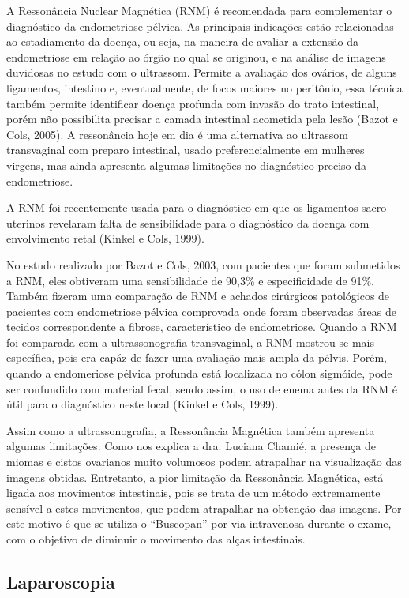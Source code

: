 \documentclass[12pt]{article} %
\begin{document}
A Ressonância Nuclear Magnética (RNM) é recomendada para complementar o diagnóstico da endometriose pélvica. As principais indicações estão relacionadas ao estadiamento da doença, ou seja, na maneira de avaliar a extensão da endometriose em relação ao órgão no qual se originou, e na análise de imagens duvidosas no estudo com o ultrassom. Permite a avaliação dos ovários, de alguns ligamentos, intestino e, eventualmente, de focos maiores no peritônio, essa técnica também permite identificar
doença profunda com invasão do trato intestinal, porém
não possibilita precisar a camada intestinal acometida pela
lesão (Bazot e Cols, 2005). A ressonância hoje em dia é uma alternativa ao ultrassom transvaginal com preparo intestinal, usado preferencialmente em mulheres virgens, mas ainda apresenta algumas limitações no diagnóstico preciso da endometriose.

A RNM foi recentemente usada para o diagnóstico em que os ligamentos
sacro uterinos revelaram falta de sensibilidade para o diagnóstico da
doença com envolvimento retal (Kinkel e Cols, 1999).

No estudo realizado por Bazot e Cols, 2003, com pacientes que foram
submetidos a RNM, eles obtiveram uma sensibilidade de 90,3\% e
especificidade de 91\%. Também fizeram uma comparação de RNM e
achados cirúrgicos patológicos de pacientes com endometriose pélvica
comprovada onde foram observadas áreas de tecidos correspondente a
fibrose, característico de endometriose. Quando a RNM foi comparada
com a ultrassonografia transvaginal, a RNM mostrou-se mais específica,
pois era capáz de fazer uma avaliação mais ampla da pélvis. Porém,
quando a endomeriose pélvica profunda está localizada no cólon
sigmóide, pode ser confundido com material fecal, sendo assim, o uso
de enema antes da RNM é útil para o diagnóstico neste local (Kinkel e
Cols, 1999).

Assim como a ultrassonografia, a Ressonância Magnética também apresenta algumas limitações. Como nos explica a dra. Luciana Chamié, a presença de miomas e cistos ovarianos muito volumosos podem atrapalhar na visualização das imagens obtidas. Entretanto, a pior limitação da Ressonância Magnética, está ligada aos movimentos intestinais, pois se trata de um método extremamente sensível a estes movimentos, que podem atrapalhar na obtenção das imagens. Por este motivo é que se utiliza o ``Buscopan'' por via intravenosa durante o exame, com o objetivo de diminuir o movimento das alças intestinais.

\subsection{Laparoscopia}
\end{document}
